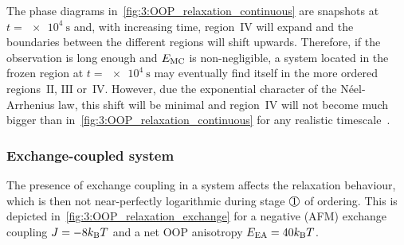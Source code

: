 
The phase diagrams in~\cref{fig:3:OOP_relaxation_continuous} are snapshots at $t = \SI{e4}{\second}$ and, with increasing time, region~$\mathrm{IV}$ will expand and the boundaries between the different regions will shift upwards.
Therefore, if the observation is long enough and $E_\mathrm{MC}$ is non-negligible, a system located in the frozen region at $t = \SI{e4}{\second}$ may eventually find itself in the more ordered regions~$\mathrm{II}$, $\mathrm{III}$ or~$\mathrm{IV}$.
However, due the exponential character of the N\'eel-Arrhenius law, this shift will be minimal and region~$\mathrm{IV}$ will not become much bigger than in~\cref{fig:3:OOP_relaxation_continuous} for any realistic timescale~\cite{KUR-24}.

\subsubsection{Exchange-coupled system}
The presence of exchange coupling in a system affects the relaxation behaviour, which is then not near-perfectly logarithmic during stage $\circled{1}$ of ordering.
This is depicted in~\cref{fig:3:OOP_relaxation_exchange} for a negative (AFM) exchange coupling $J=-8\kBT$ and a net OOP anisotropy $\EEA = 40\kBT$.

